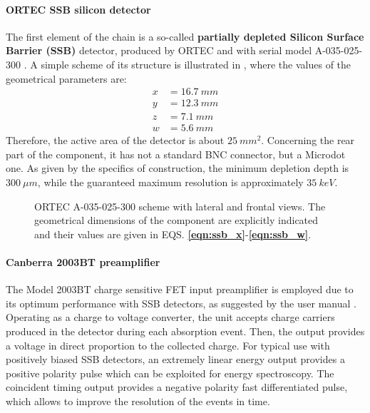 \documentclass[../../main/main.tex]{subfiles}
\begin{document}
\paragraph{ORTEC SSB silicon detector}
The first element of the chain is a so-called \textbf{partially depleted Silicon Surface Barrier (SSB)} detector, produced by ORTEC and with serial model A-035-025-300 \cite{ssb_detector}. A simple scheme of its structure is illustrated in , where the values of the geometrical parameters are:
\begin{align}
    x &= 16.7 \ \si{mm} \label{eqn:ssb_x}   \\
    y &= 12.3 \ \si{mm} \label{eqn:ssb_y}   \\
    z &=  7.1 \ \si{mm} \label{eqn:ssb_z}   \\
    w &=  5.6 \ \si{mm} \label{eqn:ssb_w}   
\end{align}
Therefore, the active area of the detector is about \( 25 \ \si{mm^{2}} \). Concerning the rear part of the component, it has not a standard BNC connector, but a Microdot one. As given by the specifics of construction, the minimum depletion depth is \( 300 \ \si{\mu m} \), while the guaranteed maximum
resolution is approximately \( 35 \ \si{keV} \).

\begin{figure}[h]
    
    \caption{ORTEC A-035-025-300 scheme with lateral and frontal views. The geometrical dimensions of the component are explicitly indicated and their values are given in EQS. \textbf{\ref{eqn:ssb_x}}-\textbf{\ref{eqn:ssb_w}}.}
    \label{fig:ssb_scheme}
\end{figure}


\paragraph{Canberra 2003BT preamplifier}
The Model 2003BT charge sensitive FET input preamplifier is employed due to its optimum performance with SSB detectors, as suggested by the user manual \cite{canberra_2003BT}. Operating as a charge to voltage converter, the unit accepts charge carriers produced in the detector during each absorption event. Then, the output provides a voltage in direct proportion to the collected charge.
For typical use with positively biased SSB detectors, an extremely linear energy output provides a positive polarity pulse which can be exploited for energy spectroscopy. The coincident timing output provides a negative polarity fast differentiated pulse, which allows to improve the resolution of the events in time.
\end{document}
